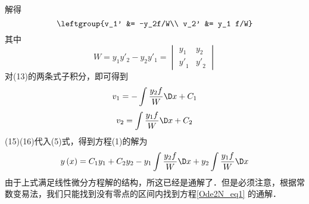 解得
\begin{equation}
\leftgroup{v_1' &= -y_2f/W\\
v_2' &= y_1 f/W}
\end{equation}
其中
\begin{equation}
W = {y_1}{y'_2} - {y_2}{y'_1} = 
\begin{vmatrix}
{{y_1}}&{{y_2}}\\
{{{y'}_1}}&{{{y'}_2}}
\end{vmatrix}
\end{equation}
对(13)的两条式子积分，即可得到
\[{v_1} =  - \int {\frac{{{y_2}f}}{W}\D x}  + {C_1}\]
\[{v_2} = \int {\frac{{{y_1}f}}{W}\D x}  + {C_2}\]
(15)(16)代入(5)式，得到方程(1)的解为
\[y\left( x \right) = {C_1}{y_1} + {C_2}{y_2} - {y_1}\int {\frac{{{y_2}f}}{W}\D x + {y_2}\int {\frac{{{y_1}f}}{W}\D x} } \]
由于上式满足线性微分方程解的结构，所这已经是通解了．但是必须注意，根据常数变易法，我们只能找到没有零点的区间内找到方程\autoref{Ode2N_eq1} 的通解．

